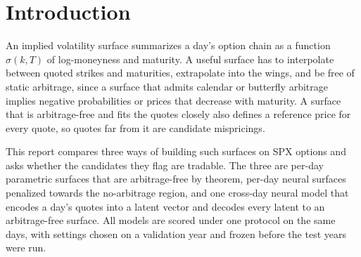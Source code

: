 \section{Introduction}
\label{sec:intro}

An implied volatility surface summarizes a day's option chain as a function $\sigma(k,T)$ of
log-moneyness and maturity. A useful surface has to interpolate between quoted strikes and
maturities, extrapolate into the wings, and be free of static arbitrage, since a surface that
admits calendar or butterfly arbitrage implies negative probabilities or prices that decrease with
maturity. A surface that is arbitrage-free and fits the quotes closely also defines a reference
price for every quote, so quotes far from it are candidate mispricings.

This report compares three ways of building such surfaces on SPX options and asks whether the
candidates they flag are tradable. The three are per-day parametric surfaces that are
arbitrage-free by theorem, per-day neural surfaces penalized towards the no-arbitrage region, and
one cross-day neural model that encodes a day's quotes into a latent vector and decodes every
latent to an arbitrage-free surface. All models are scored under one protocol on the same days,
with settings chosen on a validation year and frozen before the test years were run.

